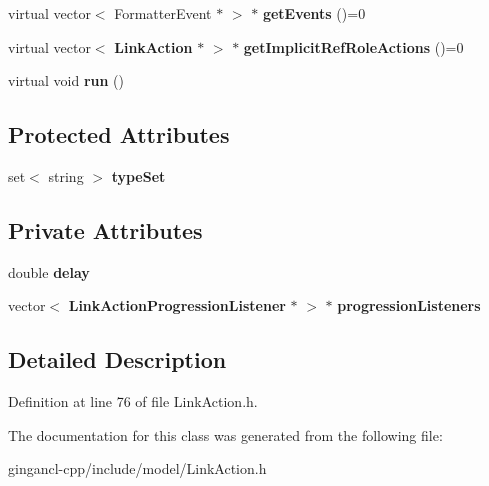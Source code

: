 \begin{CompactItemize}
\item 
virtual vector$<$ FormatterEvent $\ast$ $>$ $\ast$ \textbf{getEvents} ()=0\label{classbr_1_1pucrio_1_1telemidia_1_1ginga_1_1ncl_1_1model_1_1link_1_1LinkAction_8e62c6fde84172b6262fece11f155a89}

\item 
virtual vector$<$ {\bf LinkAction} $\ast$ $>$ $\ast$ \textbf{getImplicitRefRoleActions} ()=0\label{classbr_1_1pucrio_1_1telemidia_1_1ginga_1_1ncl_1_1model_1_1link_1_1LinkAction_996adea864c04ab061419b9c50ed72e4}

\item 
virtual void \textbf{run} ()\label{classbr_1_1pucrio_1_1telemidia_1_1ginga_1_1ncl_1_1model_1_1link_1_1LinkAction_72fcb26a14f6beb1c3fbace9ab3e7dbb}

\end{CompactItemize}
\subsection*{Protected Attributes}
\begin{CompactItemize}
\item 
set$<$ string $>$ {\bf typeSet}\label{classbr_1_1pucrio_1_1telemidia_1_1ginga_1_1ncl_1_1model_1_1link_1_1LinkAction_145b3afaa194308141d367cc1393d565}

\end{CompactItemize}
\subsection*{Private Attributes}
\begin{CompactItemize}
\item 
double {\bf delay}\label{classbr_1_1pucrio_1_1telemidia_1_1ginga_1_1ncl_1_1model_1_1link_1_1LinkAction_0bf98c9ae4eac6da250cb1e2fac20365}

\item 
vector$<$ {\bf LinkActionProgressionListener} $\ast$ $>$ $\ast$ {\bf progressionListeners}\label{classbr_1_1pucrio_1_1telemidia_1_1ginga_1_1ncl_1_1model_1_1link_1_1LinkAction_f9862ac297b09166ec633cdf05fb322c}

\end{CompactItemize}


\subsection{Detailed Description}




Definition at line 76 of file LinkAction.h.

The documentation for this class was generated from the following file:\begin{CompactItemize}
\item 
gingancl-cpp/include/model/LinkAction.h\end{CompactItemize}
